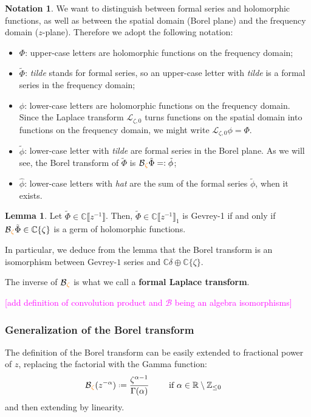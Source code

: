 \documentclass{article}
\theoremstyle{definition}
\newcommand{\Z}{\mathbb{Z}}
\newcommand{\R}{\mathbb{R}}
\newcommand{\C}{\mathbb{C}}
\newcommand*{\defeq}{\mathrel{\vcenter{\baselineskip0.5ex \lineskiplimit0pt
                     \hbox{\scriptsize.}\hbox{\scriptsize.}}}%
                     =}
\newcommand{\laplace}{\mathcal{L}}
\newcommand{\borel}{\mathcal{B}}
\newtheorem{lemma}[definition]{Lemma}
\newtheorem*{notation*}{Notation}
\begin{document}
\begin{notation*}
We want to distinguish between formal series and holomorphic functions, as well as between the spatial domain (Borel plane) and the frequency domain ($z$-plane). Therefore we adopt the following notation:
\begin{itemize}
\item $\Phi$: upper-case letters are holomorphic functions on the frequency domain;
\item $\tilde{\Phi}$: \textit{tilde} stands for formal series, so an upper-case letter with \textit{tilde} is a formal series in the frequency domain;
\item $\phi$: lower-case letters are holomorphic functions on the frequency domain. Since the Laplace transform $\laplace_{\zeta, 0}$ turns functions on the spatial domain into functions on the frequency domain, we might write $\laplace_{\zeta,0}\phi=\Phi$.
\item $\tilde{\phi}$: lower-case letter with \textit{tilde} are formal series in the Borel plane. As we will see, the Borel transform of $\tilde{\Phi}$ is $\borel\textcolor{orange}{_\zeta} \tilde{\Phi}=:\tilde{\phi}$; 
\item $\hat{\phi}$: lower-case letters with \textit{hat} are the sum of the formal series $\tilde{\phi}$, when it exists.  
\end{itemize}
\end{notation*}  

\begin{lemma}
Let $\tilde{\Phi}\in\C \llbracket z^{-1} \rrbracket$. Then, $\tilde{\Phi}\in\C \llbracket z^{-1} \rrbracket_1$ is Gevrey-1 if and only if $\borel\textcolor{orange}{_\zeta}\tilde{\Phi}\in\C\lbrace\zeta\rbrace$ is a germ of holomorphic functions. 
\end{lemma}
In particular, we deduce from the lemma that the Borel transform is an isomorphism between Gevrey-$1$ series and $\C\delta\oplus\C\lbrace\zeta\rbrace$. 

The inverse of $\borel\textcolor{orange}{_\zeta}$ is what we call a \textbf{formal Laplace transform}.

\textcolor{magenta}{[add definition of convolution product and $\borel$ being an algebra isomorphisms]}


\subsubsection{Generalization of the Borel transform}
The definition of the Borel transform can be easily extended to fractional power of $z$, replacing the factorial with the Gamma function: 
\begin{align*}
\borel\textcolor{orange}{_\zeta}(z^{-\alpha})\defeq \frac{\zeta^{\alpha-1}}{\Gamma(\alpha)} & \qquad \text{ if } \alpha\in\R\setminus\Z_{\leq 0}
\end{align*}
and then extending by linearity.
\end{document}
